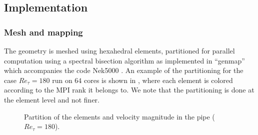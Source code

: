 \documentclass{sig-alternate}
\begin{document}


\subsection{Implementation}
\label{sec:implementation}

\subsubsection{Mesh and mapping}
\label{sec:code}
The geometry is meshed using hexahedral elements, partitioned for parallel
computation using a spectral bisection algorithm as implemented in ``genmap''
which accompanies the code Nek5000 \cite{argonne:nekdoc}. An example of the
partitioning for the case $Re_{\tau} = 180$ run on $64$ cores is shown in , where each element is colored according to the MPI rank it belongs to. We note that the partitioning is done at the element level and not finer.
\begin{figure}
  \centering
  \caption{Partition of the elements and velocity magnitude in the pipe ($Re_{\tau}=180$).}
  \label{fig:partition}
\end{figure}
 
\end{document}
